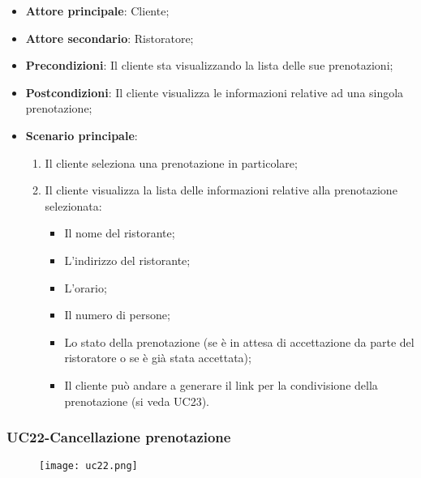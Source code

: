 \begin{itemize}
\item \textbf{Attore principale}: Cliente;
\item \textbf{Attore secondario}: Ristoratore;
\item \textbf{Precondizioni}: Il cliente sta visualizzando la lista delle sue prenotazioni;
\item \textbf{Postcondizioni}: Il cliente visualizza le informazioni relative ad una singola prenotazione;
\item \textbf{Scenario principale}:
\begin{enumerate}
\item Il cliente seleziona una prenotazione in particolare;
\item Il cliente visualizza la lista delle informazioni relative alla prenotazione selezionata:
\begin{itemize}
\item Il nome del ristorante;
\item L'indirizzo del ristorante;
\item L'orario;
\item Il numero di persone;
\item Lo stato della prenotazione (se è in attesa di accettazione da parte del ristoratore o se è già stata accettata);
\item Il cliente può andare a generare il link per la condivisione della prenotazione (si veda UC23).
\end{itemize}
\end{enumerate}
\end{itemize}

\pagebreak
\subsubsection{UC22-Cancellazione prenotazione}
\begin{figure}[h] \texttt{[image: uc22.png]} \end{figure}

